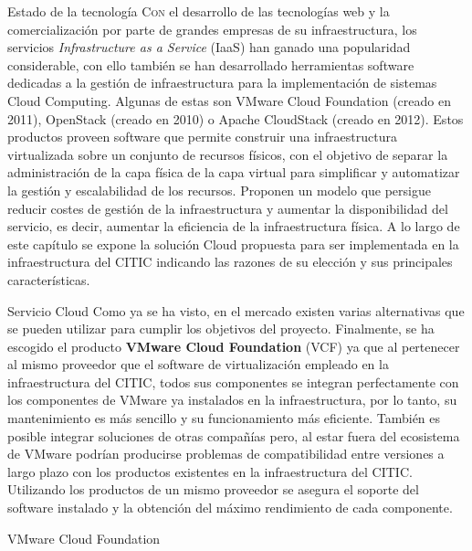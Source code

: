\begin{chapter}{Estado de la tecnología}
\label{chap:estado-tecnologia}
    \lettrine{C}{on} el desarrollo de las tecnologías web y la comercialización por parte de grandes empresas de su infraestructura, los servicios \textit{Infrastructure as a Service} (IaaS) han ganado una popularidad considerable, con ello también se han desarrollado herramientas software dedicadas a la gestión de infraestructura para la implementación de sistemas Cloud Computing. Algunas de estas son VMware Cloud Foundation (creado en 2011), OpenStack (creado en 2010) o Apache CloudStack (creado en 2012). Estos productos proveen software que permite construir una infraestructura virtualizada sobre un conjunto de recursos físicos, con el objetivo de separar la administración de la capa física de la capa virtual para simplificar y automatizar la gestión y escalabilidad de los recursos. Proponen un modelo que persigue reducir costes de gestión de la infraestructura y aumentar la disponibilidad del servicio, es decir, aumentar la eficiencia de la infraestructura física.
    A lo largo de este capítulo se expone la solución Cloud propuesta para ser implementada en la infraestructura del CITIC indicando las razones de su elección y sus principales características.

\begin{section}{Servicio Cloud}    
    Como ya se ha visto, en el mercado existen varias alternativas que se pueden utilizar para cumplir los objetivos del proyecto. Finalmente, se ha escogido el producto \textbf{VMware Cloud Foundation} (VCF) ya que al pertenecer al mismo proveedor que el software de virtualización empleado en la infraestructura del CITIC, todos sus componentes se integran perfectamente con los componentes de VMware ya instalados en la infraestructura, por lo tanto, su mantenimiento es más sencillo y su funcionamiento más eficiente. También es posible integrar soluciones de otras compañías pero, al estar fuera del ecosistema de VMware podrían producirse problemas de compatibilidad entre versiones a largo plazo con los productos existentes en la infraestructura del CITIC. Utilizando los productos de un mismo proveedor se asegura el soporte del software instalado y la obtención del máximo rendimiento de cada componente.        
    \begin{subsection}{VMware Cloud Foundation}
    

\end{subsection}
\end{section}
\end{chapter}
